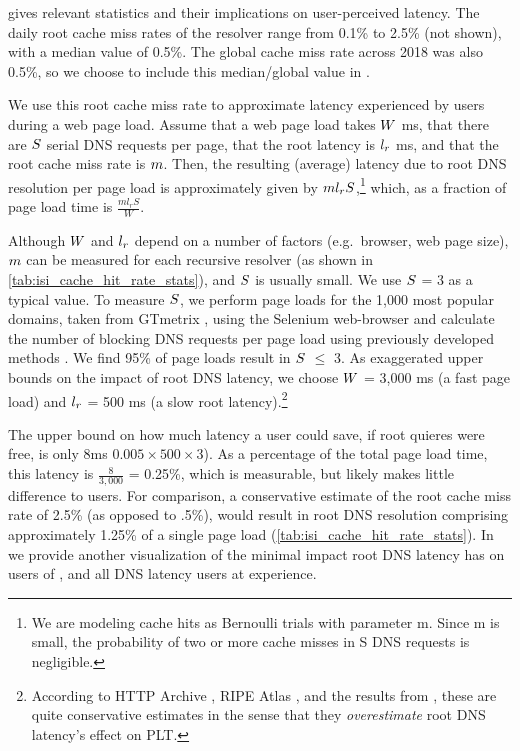 \documentclass[sigconf,letterpaper,nonacm,10pt,anonymous]{acmart}
\begin{document}
 gives relevant statistics and their
implications on user-perceived latency. The daily root cache miss rates
of the resolver range from 0.1\% to 2.5\% (not shown), with a median
value of 0.5\%. The global cache miss rate across 2018 was also 0.5\%,
so we choose to include this median/global value in
.

We use this root cache miss rate to approximate latency experienced by
users during a web page load. Assume that a web page load takes
\(\mathnormal{W}\) ms, that there are \(\mathnormal{S}\) serial DNS
requests per page, that the root latency is \(\mathnormal{l_r}\) ms, and
that the root cache miss rate is \(\mathnormal{m}\). Then, the resulting
(average) latency due to root DNS resolution per page load is
approximately given by \(\mathnormal{m l_r S}\),\footnote{We are
  modeling cache hits as Bernoulli trials with parameter m. Since m is
  small, the probability of two or more cache misses in S DNS requests
  is negligible.} which, as a fraction of page load time is
\(\frac{m l_r S}{W}\).

Although \(\mathnormal{W}\) and \(\mathnormal{l_r}\) depend on a number
of factors (e.g.~browser, web page size), \(\mathnormal{m}\) can be
measured for each recursive resolver (as shown in
\cref{tab:isi_cache_hit_rate_stats}), and \(\mathnormal{S}\) is usually
small. We use \(\mathnormal{S}\) = 3 as a typical value. To measure
\(\mathnormal{S}\), we perform page loads for the 1,000 most popular
domains, taken from GTmetrix \cite{gtmetrix}, using the Selenium
web-browser and calculate the number of blocking DNS requests per page
load using previously developed methods \cite{sundaresan2013web}. We
find 95\% of page loads result in \(\mathnormal{S}\) \(\leq\) 3. As
exaggerated upper bounds on the impact of root DNS latency, we choose
\(\mathnormal{W}\) = 3,000 ms (a fast page load) and
\(\mathnormal{l_r}\) = 500 ms (a slow root latency).\footnote{According
  to HTTP Archive \cite{http_archive}, RIPE Atlas \cite{staff2015ripe},
  and the results from \ISItwo, these are quite conservative estimates
  in the sense that they \emph{overestimate} root DNS latency's effect
  on PLT.}

The upper bound on how much latency a user could save, if root quieres
were free, is only 8ms \(0.005 \times 500 \times 3\)). As a percentage
of the total page load time, this latency is \(\frac{8}{3,000}\) =
0.25\%, which is measurable, but likely makes little difference to
users. For comparison, a conservative estimate of the root cache miss
rate of 2.5\% (as opposed to .5\%), would result in root DNS resolution
comprising approximately 1.25\% of a single page load
(\cref{tab:isi_cache_hit_rate_stats}). In
 we provide another visualization of
the minimal impact root DNS latency has on users of \ISItwo, and all DNS
latency users at \ISItwo experience.
\end{document}
